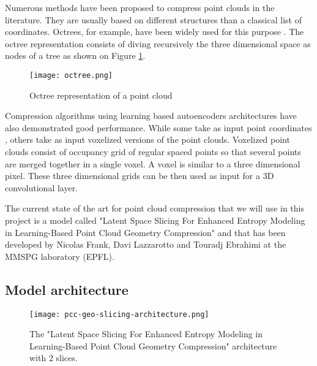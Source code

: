 \label{chapter:sota-pcc}

Numerous methods have been proposed to compress point clouds in the literature. They are usually based on different structures than a classical list of coordinates.                                
Octrees, for example, have been widely used for this purpose \cite{bib:octree}. 
The octree representation consists of diving recursively the three dimensional space as nodes of a tree as shown on Figure \ref{fig:octree}.

\begin{figure}
    \centering
    \texttt{[image: octree.png]}
    \caption{Octree representation of a point cloud}
    \label{fig:octree}
\end{figure}


Compression algorithms using learning based autoencoders architectures have also demonstrated good performance. While some take as input point coordinates \cite{bib:9102866}, others take as input voxelized versions of the point clouds. 
Voxelized point clouds consist of occupancy grid of regular spaced points so that several points are merged together in a single voxel.
A voxel is similar to a three dimensional pixel.
These three dimensional grids can be then used as input for a 3D convolutional layer.


The current state of the art for point cloud compression that we will use in this project is a model called "Latent Space Slicing For Enhanced Entropy Modeling in Learning-Based Point Cloud Geometry Compression" and that has been developed by Nicolas Frank, Davi Lazzarotto and Touradj Ebrahimi at the MMSPG laboratory (EPFL).

\subsection{Model architecture}

\begin{figure}
    \centering
    \texttt{[image: pcc-geo-slicing-architecture.png]}
    \caption{The "Latent Space Slicing For Enhanced Entropy Modeling in Learning-Based Point Cloud Geometry Compression" architecture with $2$ slices.}
    \label{fig:pcc-geo-slicing-architecture}
\end{figure}

